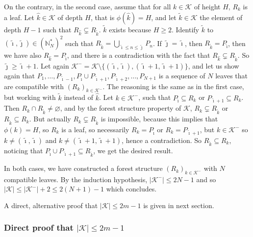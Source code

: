 \documentclass[
  11pt,
  a4paper,
]{article}
\theoremstyle{plain}
\theoremstyle{plain}
\theoremstyle{definition}
\theoremstyle{plain}
\theoremstyle{definition}
\theoremstyle{remark}
\begin{document}
On the contrary, in the second case, assume that for all
\(k\in\mathcal{K}\) of height \(H\), \(R_k\) is a leaf. Let
\(\hat k\in\mathcal{K}\) of depth \(H\), that is \(\phi(\hat k)=H\), and
let \(\tilde k\in\mathcal{K}\) the element of depth \(H-1\) such that
\(R_{\hat k}\subsetneq R_{\tilde k}\). \(\tilde k\) exists because
\(H\geq2\). Identify \(\tilde k\) to
\((\tilde\imath, \tilde\jmath)\in \left(\mathbb N_N^* \right)^2\) such
that \(R_{\tilde k}=\bigcup_{\tilde\imath\leq n\leq \tilde\jmath}P_n\).
If \(\tilde\jmath=\tilde\imath\), then
\(R_{\tilde k}=P_{\tilde\imath}\), then we have also
\(R_{\hat k}=P_{\tilde\imath}\), and there is a contradiction with the
fact that \(R_{\hat k}\subsetneq R_{\tilde k}\). So
\(\tilde\jmath\geq\tilde\imath+1\). Let again
\(\mathcal{K}^-=\mathcal{K}\setminus\{(\tilde\imath, \tilde\imath), (\tilde\imath+1, \tilde\imath+1)\}\),
and let us show again that
\(P_1,\dotsc,P_{\tilde\imath-1}, P_{\tilde\imath}\cup P_{\tilde\imath+1},P_{\tilde\imath+2},\dotsc,P_{N+1}\)
is a sequence of \(N\) leaves that are compatible with
\((R_k)_{k\in\mathcal{K}^-}\). The reasoning is the same as in the first
case, but working with \(\tilde k\) instead of \(\hat k\). Let
\(k\in\mathcal{K}^-\), such that \(P_{\tilde\imath}\subseteq R_k\) or
\(P_{\tilde\imath+1}\subseteq R_k\). Then
\(R_k\cap R_{\tilde k}\neq\varnothing\), and by the forest structure
property of \(\mathcal{K}\), \(R_k\subsetneq R_{\tilde k}\) or
\(R_{\tilde k}\subseteq R_k\). But actually
\(R_k\subsetneq R_{\tilde k}\) is impossible, because this implies that
\(\phi(k)=H\), so \(R_k\) is a leaf, so necessarily
\(R_k=P_{\tilde\imath}\) or \(R_k=P_{\tilde\imath+1}\), but
\(k\in\mathcal{K}^-\) so \(k\neq(\tilde\imath, \tilde\imath)\) and
\(k\neq(\tilde\imath+1, \tilde\imath+1)\), hence a contradiction. So
\(R_{\tilde k}\subseteq R_k\), noticing that
\(P_{\tilde\imath}\cup P_{\tilde\imath+1}\subseteq R_{\tilde k}\), we
get the desired result.

In both cases, we have constructed a forest structure
\((R_k)_{k\in\mathcal{K}^-}\) with \(N\) compatible leaves. By the
induction hypothesis, \(|\mathcal{K}^-|\leq 2N-1\) and so
\(|\mathcal{K}|\leq|\mathcal{K}^-|+2\leq 2(N+1)-1\) which concludes.

A direct, alternative proof that \(|\mathcal{K}|\leq 2m-1\) is given in
next section.

\subsubsection{\texorpdfstring{Direct proof that
\(|\mathcal{K}|\leq 2m-1\)}{Direct proof that \textbar\textbackslash mathcal\{K\}\textbar\textbackslash leq 2m-1}}\label{direct-proof-that-mathcalkleq-2m-1}
\end{document}
